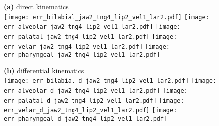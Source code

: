 \documentclass[varwidth=7.5in]{standalone}
\begin{document}
\raggedright

{\bf (a)} direct kinematics\\
\texttt{[image: err\_bilabial\_jaw2\_tng4\_lip2\_vel1\_lar2.pdf]}%
\texttt{[image: err\_alveolar\_jaw2\_tng4\_lip2\_vel1\_lar2.pdf]}%
\texttt{[image: err\_palatal\_jaw2\_tng4\_lip2\_vel1\_lar2.pdf]}%
\texttt{[image: err\_velar\_jaw2\_tng4\_lip2\_vel1\_lar2.pdf]}%
\texttt{[image: err\_pharyngeal\_jaw2\_tng4\_lip2\_vel1\_lar2.pdf]}

{\bf (b)} differential kinematics\\
\texttt{[image: err\_bilabial\_d\_jaw2\_tng4\_lip2\_vel1\_lar2.pdf]}%
\texttt{[image: err\_alveolar\_d\_jaw2\_tng4\_lip2\_vel1\_lar2.pdf]}%
\texttt{[image: err\_palatal\_d\_jaw2\_tng4\_lip2\_vel1\_lar2.pdf]}%
\texttt{[image: err\_velar\_d\_jaw2\_tng4\_lip2\_vel1\_lar2.pdf]}%
\texttt{[image: err\_pharyngeal\_d\_jaw2\_tng4\_lip2\_vel1\_lar2.pdf]}
\end{document}
